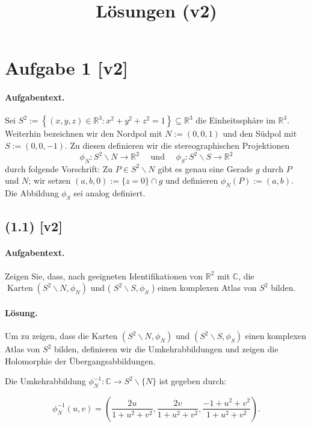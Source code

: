 \documentclass[11pt,a4paper]{article}
\title{Lösungen (v2)}
\date{}
\begin{document}
\maketitle

\section*{Aufgabe 1 [v2]}
\paragraph{Aufgabentext.}
Sei $S^2:=\left\{(x, y, z) \in \mathbb{R}^3: x^2+y^2+z^2=1\right\} \subseteq \mathbb{R}^3$ die Einheitssphäre im $\mathbb{R}^3$. Weiterhin bezeichnen wir den Nordpol mit $N:=(0,0,1)$ und den Südpol mit $S:=(0,0,-1)$. Zu diesen definieren wir die stereographischen Projektionen
$$
\phi_N: S^2 \backslash N \rightarrow \mathbb{R}^2 \quad \text { und } \quad \phi_S: S^2 \backslash S \rightarrow \mathbb{R}^2
$$
durch folgende Vorschrift: Zu $P \in S^2 \backslash N$ gibt es genau eine Gerade $g$ durch $P$ und $N$; wir setzen $(a, b, 0):=\{z=0\} \cap g$ und definieren $\phi_N(P):=(a, b)$. Die Abbildung $\phi_S$ sei analog definiert.

\subsection*{(1.1) [v2]}
\paragraph{Aufgabentext.}
Zeigen Sie, dass, nach geeigneten Identifikationen von $\mathbb{R}^2$ mit $\mathbb{C}$, die $\operatorname{Karten}\left(S^2 \backslash N, \phi_N\right)$ und ( $S^2 \backslash S, \phi_S$ ) einen komplexen Atlas von $S^2$ bilden.

\paragraph{Lösung.}
Um zu zeigen, dass die Karten $\left(S^2 \backslash N, \phi_N\right)$ und $\left(S^2 \backslash S, \phi_S\right)$ einen komplexen Atlas von $S^2$ bilden, definieren wir die Umkehrabbildungen und zeigen die Holomorphie der Übergangsabbildungen.

Die Umkehrabbildung $\phi_N^{-1}: \mathbb{C} \to S^2 \backslash \{N\}$ ist gegeben durch:

\[
\phi_N^{-1}(u, v) = \left( \frac{2u}{1 + u^2 + v^2}, \frac{2v}{1 + u^2 + v^2}, \frac{-1 + u^2 + v^2}{1 + u^2 + v^2} \right).
\]
\end{document}

